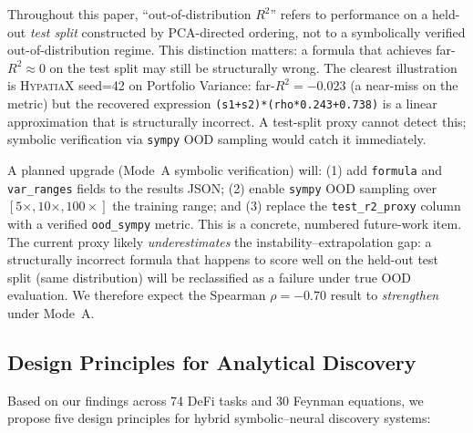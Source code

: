 \documentclass[twoside,11pt]{article}
\newcommand{\Rsq}{R^{2}}
\begin{document}
Throughout this paper, ``out-of-distribution $\Rsq$'' refers to performance on a
held-out \emph{test split} constructed by PCA-directed ordering, not to a
symbolically verified out-of-distribution regime.  This distinction matters: a
formula that achieves far-$\Rsq \approx 0$ on the test split may still be
structurally wrong.  The clearest illustration is \textsc{HypatiaX} seed=42 on
Portfolio Variance: far-$\Rsq = -0.023$ (a near-miss on the metric) but the
recovered expression \texttt{(s1+s2)*(rho*0.243+0.738)} is a linear approximation
that is structurally incorrect.  A test-split proxy cannot detect this; symbolic
verification via \texttt{sympy} OOD sampling would catch it immediately.

A planned upgrade (Mode~A symbolic verification) will: (1) add \texttt{formula} and
\texttt{var\_ranges} fields to the results JSON; (2) enable \texttt{sympy} OOD
sampling over $[5\times, 10\times, 100\times]$ the training range; and (3) replace
the \texttt{test\_r2\_proxy} column with a verified \texttt{ood\_sympy} metric.
This is a concrete, numbered future-work item.  The current proxy likely
\emph{underestimates} the instability--extrapolation gap: a structurally incorrect
formula that happens to score well on the held-out test split (same distribution)
will be reclassified as a failure under true OOD evaluation.  We therefore
expect the Spearman $\rho=-0.70$ result to \emph{strengthen} under Mode~A.

\subsection{Design Principles for Analytical Discovery}

Based on our findings across 74 DeFi tasks and 30 Feynman equations, we propose five design principles for hybrid symbolic--neural discovery systems:
\end{document}
